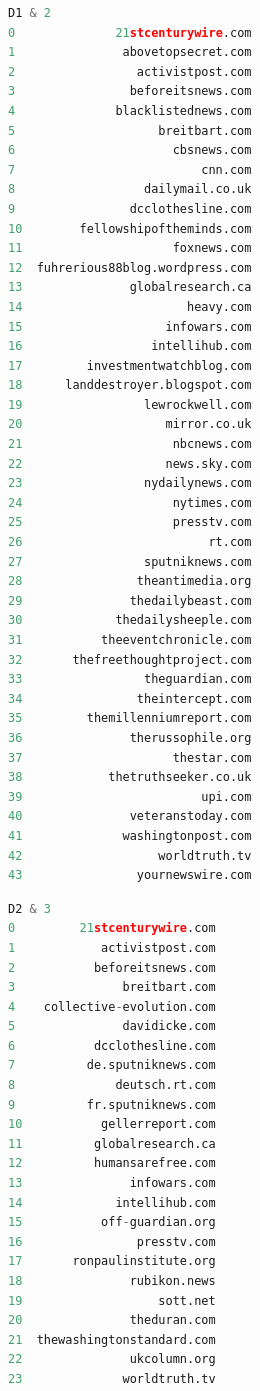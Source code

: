\documentclass[12pt]{article}
\begin{document}
\begin{lstlisting}[language=Python, caption={Domains present in both D1 and D2}, label=lst:copy]
                            D1 & 2
0              21stcenturywire.com
1               abovetopsecret.com
2                 activistpost.com
3                beforeitsnews.com
4              blacklistednews.com
5                    breitbart.com
6                      cbsnews.com
7                          cnn.com
8                  dailymail.co.uk
9                dcclothesline.com
10        fellowshipoftheminds.com
11                     foxnews.com
12  fuhrerious88blog.wordpress.com
13               globalresearch.ca
14                       heavy.com
15                    infowars.com
16                  intellihub.com
17         investmentwatchblog.com
18      landdestroyer.blogspot.com
19                 lewrockwell.com
20                    mirror.co.uk
21                     nbcnews.com
22                    news.sky.com
23                 nydailynews.com
24                     nytimes.com
25                     presstv.com
26                          rt.com
27                 sputniknews.com
28                theantimedia.org
29               thedailybeast.com
30             thedailysheeple.com
31           theeventchronicle.com
32       thefreethoughtproject.com
33                 theguardian.com
34                theintercept.com
35         themillenniumreport.com
36               therussophile.org
37                     thestar.com
38            thetruthseeker.co.uk
39                         upi.com
40               veteranstoday.com
41              washingtonpost.com
42                   worldtruth.tv
43                yournewswire.com
\end{lstlisting}

\begin{lstlisting}[language=Python, caption={Domains present in both D2 and D3}, label=lst:copy]
                       D2 & 3
0         21stcenturywire.com
1            activistpost.com
2           beforeitsnews.com
3               breitbart.com
4    collective-evolution.com
5               davidicke.com
6           dcclothesline.com
7          de.sputniknews.com
8              deutsch.rt.com
9          fr.sputniknews.com
10           gellerreport.com
11          globalresearch.ca
12          humansarefree.com
13               infowars.com
14             intellihub.com
15           off-guardian.org
16                presstv.com
17       ronpaulinstitute.org
18               rubikon.news
19                   sott.net
20               theduran.com
21  thewashingtonstandard.com
22               ukcolumn.org
23              worldtruth.tv
\end{lstlisting}
\end{document}
